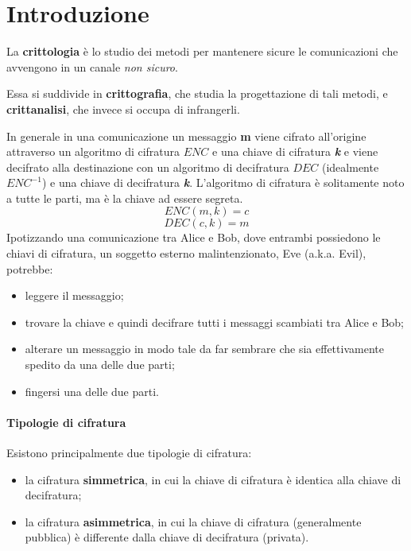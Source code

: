 \documentclass[12pt]{article}
\begin{document}
\maketitle
\tableofcontents

\section{Introduzione}
La \textbf{crittologia} è lo studio dei metodi per mantenere sicure le comunicazioni che avvengono in un canale \textit{non sicuro}.

Essa si suddivide in \textbf{crittografia}, che studia la progettazione di tali metodi, e \textbf{crittanalisi}, che invece si occupa di infrangerli.
\begin{center}
\end{center}
In generale in una comunicazione un messaggio \textbf{m} viene cifrato all'origine attraverso un algoritmo di cifratura \textbf{\(ENC\)} e una chiave di cifratura \textbf{\textit{k}} e viene decifrato alla destinazione con un algoritmo di decifratura \textbf{\(DEC\)} (idealmente \(ENC^{-1}\)) e una chiave di decifratura \textbf{\textit{k}}. L'algoritmo di cifratura è solitamente noto a tutte le parti, ma è la chiave ad essere segreta.
\[ENC(m,k)=c\]
\[DEC(c,k)=m\]
Ipotizzando una comunicazione tra Alice e Bob, dove entrambi possiedono le chiavi di cifratura, un soggetto esterno malintenzionato, Eve (a.k.a. Evil), potrebbe:
\begin{itemize}
\item leggere il messaggio;
\item trovare la chiave e quindi decifrare tutti i messaggi scambiati tra Alice e Bob;
\item alterare un messaggio in modo tale da far sembrare che sia effettivamente spedito da una delle due parti;
\item fingersi una delle due parti.
\end{itemize}
\paragraph{Tipologie di cifratura}
Esistono principalmente due tipologie di cifratura:
\begin{itemize}
\item la cifratura \textbf{simmetrica}, in cui la chiave di cifratura è identica alla chiave di decifratura;
\item la cifratura \textbf{asimmetrica}, in cui la chiave di cifratura (generalmente pubblica) è differente dalla chiave di decifratura (privata).
\end{itemize}
\end{document}
